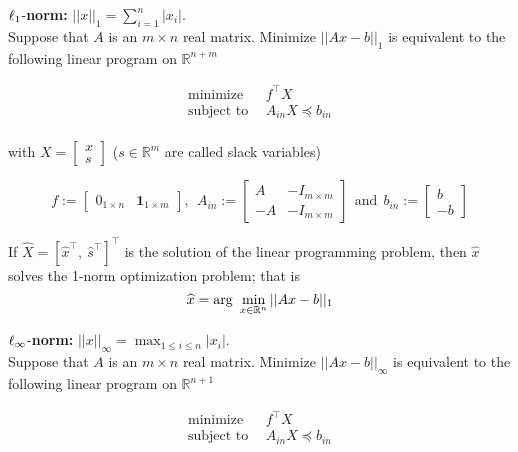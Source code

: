 \documentclass[letterpaper]{article}
\newcommand{\real}{\mathbb R}  %
\begin{document}
\newpage

\noindent ${ \bf\ell}_1$-\textbf{norm:} $||x||_1 = \sum_{i=1}^{n} |x_i|$. \\

Suppose that $A$ is an $m \times n$ real matrix. Minimize $||Ax - b||_1$ is equivalent to the following linear program on $\real^{n+m}$

\begin{align*}
\text{minimize}& ~~ f^\top X\\
\text{subject to} &~~A_{in} X \preceq b_{in} \\
\end{align*}

with $X = \left[\begin{array}{c}  x\\ s \end{array} \right]$ ($s\in \real^m$ are called slack variables)

$$f:=\left[ \begin{array}{cc}0_{1 \times n} & \textbf{1}_{1 \times m} \end{array} \right],~~A_{in}:= \left[ \begin{array}{rr}  A  & -I_{m \times m}  \\
 -A  & -I_{m \times m}\end{array} \right] ~~\text{and}~~ b_{in}:=\left[\begin{array}{r}  b\\ -b \end{array} \right]$$

If $\widehat{X}=[\widehat{x}^\top, ~ \widehat{s}^\top ]^\top $  is the solution  of the linear programming problem, then $\widehat{x}$ solves the 1-norm optimization problem; that is
$$ \widehat{x} = {\rm arg}~\min_{x \in \real^n} ||Ax - b||_1$$


\newpage
\noindent ${ \bf\ell}_\infty$-\textbf{norm:} $||x||_\infty = \max_{1 \le i \le n} |x_i|$. \\

Suppose that $A$ is an $m \times n$ real matrix. Minimize $||Ax - b||_\infty$ is equivalent to the following linear program on $\real^{n+1}$

\begin{align*}
\text{minimize}& ~~ f^\top X\\
\text{subject to} &~~A_{in} X \preceq b_{in} \\
\end{align*}
\end{document}
